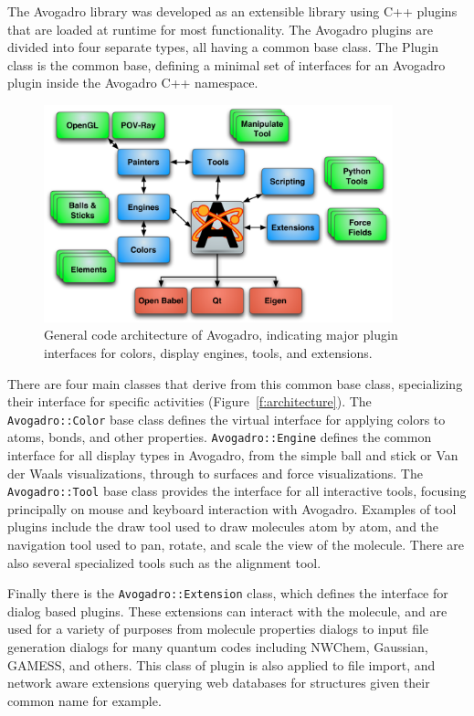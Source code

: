 \documentclass[10pt]{bmc_article}
\newenvironment{bmcformat}{\begin{raggedright}
\baselineskip20pt\sloppy\setboolean{publ}{false}}{\end{raggedright}
\baselineskip20pt\sloppy}
\begin{document}
\begin{bmcformat}
The Avogadro library was developed as an extensible library using C++ plugins
that are loaded at runtime for most functionality. The Avogadro plugins are
divided into four separate types, all having a common base class. The Plugin
class is the common base, defining a minimal set of interfaces for an Avogadro
plugin inside the Avogadro C++ namespace.

\begin{figure}
  \includegraphics[width=0.9\textwidth]{images/architecture}
  \caption{General code architecture of Avogadro, indicating major
    plugin interfaces for colors, display engines, tools, and extensions.}
 \label{f:standardReps}
\end{figure}

There are four main classes that derive from this common base class, specializing
their interface for specific activities
(Figure~\ref{f:architecture}). The {\tt Avogadro::Color} base class
defines the virtual interface for applying colors to atoms, bonds, and other properties.
 {\tt Avogadro::Engine} defines the common interface for all display types in Avogadro,
from the simple ball and stick or Van der Waals visualizations, through to
surfaces and force visualizations. The {\tt Avogadro::Tool} base class provides
the interface for all interactive tools, focusing principally on mouse and
keyboard interaction with Avogadro. Examples of tool plugins include the draw
tool used to draw molecules atom by atom, and the navigation tool used to pan,
rotate, and scale the view of the molecule. There are also several specialized
tools such as the alignment tool.

Finally there is the {\tt Avogadro::Extension} class, which defines the interface for
dialog based plugins. These extensions can interact with the molecule, and are
used for a variety of purposes from molecule properties dialogs to input file
generation dialogs for many quantum codes including NWChem, Gaussian, GAMESS, and
others. This class of plugin is also applied to file import, and network aware
extensions querying web databases for structures given their common name for
example.


\end{bmcformat}
\end{document}
